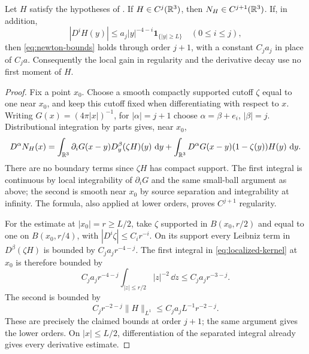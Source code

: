 \begin{lemma}\label{lem:regularity}
Let $H$ satisfy the hypotheses of .  If $H\in C^j(\mathbb R^3)$,
then $N_H\in C^{j+1}(\mathbb R^3)$.  If, in addition,
\[
 |D^iH(y)|\le a_j|y|^{-4-i}\mathbf1_{\{|y|\ge L\}}
 \quad(0\le i\le j),
\]
then \eqref{eq:newton-bounds} holds through order $j+1$, with a constant
$C_j a_j$ in place of $C_j a$.  Consequently the local gain in regularity
and the derivative decay use no first moment of $H$.
\end{lemma}

\begin{proof}
Fix a point $x_0$.  Choose a smooth compactly supported cutoff $\zeta$
equal to one near $x_0$, and keep this cutoff fixed when differentiating
with respect to $x$.  Writing $G(x)=(4\pi|x|)^{-1}$, for
$|\alpha|=j+1$ choose $\alpha=\beta+e_i$, $|\beta|=j$.  Distributional
integration by parts gives, near $x_0$,
\begin{equation}\label{eq:localized-kernel}
 D^\alpha N_H(x)
 =\int_{\mathbb R^3}\partial_iG(x-y)D_y^\beta(\zeta H)(y)\,\mathop{}\!\mathrm d y
  +\int_{\mathbb R^3}D^\alpha G(x-y)(1-\zeta(y))H(y)\,\mathop{}\!\mathrm d y.
\end{equation}
There are no boundary terms since $\zeta H$ has compact support.
The first integral is continuous by local integrability of
$\partial_iG$ and the same small-ball argument as above; the second is
smooth near $x_0$ by source separation and integrability at infinity.
The formula, also applied at lower orders, proves $C^{j+1}$ regularity.

For the estimate at $|x_0|=r\ge L/2$, take $\zeta$ supported in
$B(x_0,r/2)$ and equal to one on $B(x_0,r/4)$, with
$|D^i\zeta|\le C_i r^{-i}$.  On its support every Leibniz term in
$D^\beta(\zeta H)$ is bounded by $C_j a_jr^{-4-j}$.
The first integral in \eqref{eq:localized-kernel} at $x_0$ is therefore
bounded by
\[
 C_j a_jr^{-4-j}\int_{|z|\le r/2}|z|^{-2}\,\dd z
 \le C_j a_jr^{-3-j}.
\]
The second is bounded by
\[
 C_jr^{-2-j}\|H\|_{L^1}
 \le C_j a_jL^{-1}r^{-2-j}.
\]
These are precisely the claimed bounds at order $j+1$; the same
argument gives the lower orders.  On $|x|\le L/2$, differentiation of
the separated integral already gives every derivative estimate.
\end{proof}


